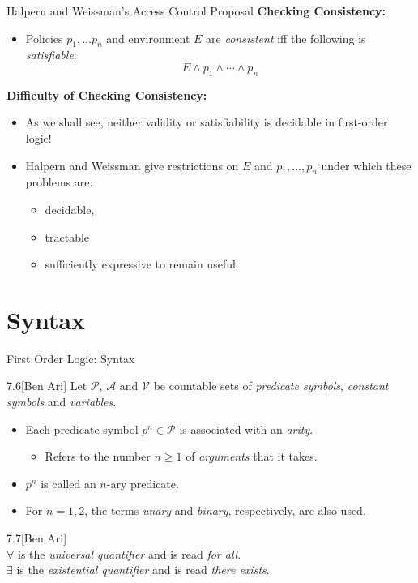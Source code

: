 \documentclass[style=sailor,size=12pt]{powerdot}
\begin{document}
\begin{wideslide}[bm=,toc=]{Halpern and Weissman's Access Control Proposal}
\textbf{Checking Consistency:}
\begin{itemize}
\item Policies $p_1,\dots p_n$ and environment $E$ are {\em consistent\/} iff
the following is {\em satisfiable\/}:
\begin{displaymath}
E\wedge p_1 \wedge \cdots \wedge p_n 
\end{displaymath}
\end{itemize}
\pause
\textbf{Difficulty of Checking Consistency:}
\begin{itemize}
\item<3-> As we shall see, neither validity or satisfiability is decidable in first-order logic!
\item<4-> Halpern and Weissman give restrictions on $E$ and $p_1,\ldots ,p_n$ under which
these problems are:
\begin{itemize}
\item<5->decidable,
\item<5->tractable
\item<5->sufficiently expressive to remain useful. 
\end{itemize}
\end{itemize}
\end{wideslide}

\section[slide=true]{Syntax}
\begin{slide}[bm=,toc=]{First Order Logic: Syntax}
\begin{defn}{7.6}[Ben Ari]
Let $\mathcal{P}$, $\mathcal{A}$ and $\mathcal{V}$ be countable sets of
\emph{predicate symbols}, \emph{constant symbols} and \emph{variables}.
\pause
\begin{itemize}
\item Each predicate symbol $p^n \in \mathcal{P}$ is associated with an \emph{arity}.
\begin{itemize}
\item Refers to the number $n \geq 1$ of \emph{arguments} that it takes. 
\end{itemize}
\item $p^n$ is called an $n$-ary predicate. 
\item For $n = 1,2$, the terms \emph{unary} and \emph{binary},
respectively, are also used.
\end{itemize}
\end{defn}
\pause
\begin{defn}{7.7}[Ben Ari]
~\\
$\forall$ is the \emph{universal quantifier} and is read \emph{for all}.\\
$\exists$ is the \emph{existential quantifier} and is read \emph{there exists}.
\end{defn}

\end{slide}
\end{document}

